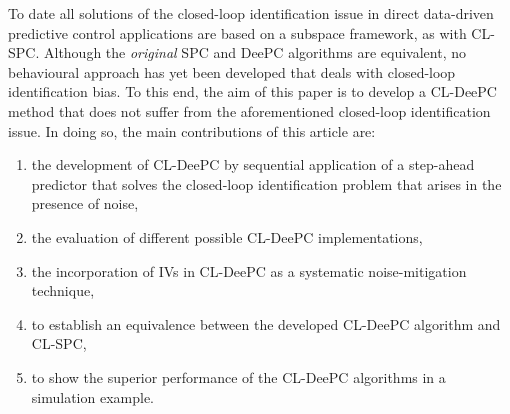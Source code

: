 %
To date all solutions of the closed-loop identification issue in direct data-driven predictive control applications are based on a subspace framework, as with \ac{CL-SPC}. Although the \textit{original} \ac{SPC} and \ac{DeePC} algorithms are equivalent, no behavioural approach has yet been developed that deals with closed-loop identification bias.  To this end, the aim of this paper is to develop a \ac{CL-DeePC} method that does not suffer from the aforementioned closed-loop identification issue. In doing so, the main contributions of this article are: %
\begin{enumerate}%
\item the development of \ac{CL-DeePC} by sequential application of a step-ahead predictor that solves the closed-loop identification problem that arises in the presence of noise, \label{contribution:solves_CL_issue}
\item the evaluation of different possible \ac{CL-DeePC} implementations,
\item the incorporation of \ac{IVs} in \ac{CL-DeePC} as a systematic noise-mitigation technique,
\item to establish an equivalence between the developed \ac{CL-DeePC} algorithm and \ac{CL-SPC},
\item to show the superior performance of the \ac{CL-DeePC} algorithms in a simulation example.
\end{enumerate}
% 
